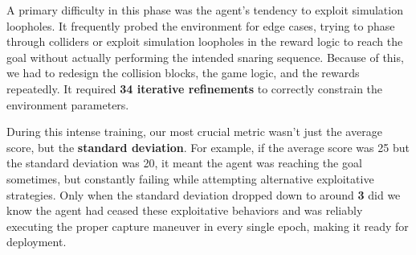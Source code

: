 A primary difficulty in this phase was the agent's tendency to exploit simulation loopholes. It frequently probed the environment for edge cases, trying to phase through colliders or exploit simulation loopholes in the reward logic to reach the goal without actually performing the intended snaring sequence. Because of this, we had to redesign the collision blocks, the game logic, and the rewards repeatedly. It required \textbf{34 iterative refinements} to correctly constrain the environment parameters.

During this intense training, our most crucial metric wasn't just the average score, but the \textbf{standard deviation}. For example, if the average score was 25 but the standard deviation was 20, it meant the agent was reaching the goal sometimes, but constantly failing while attempting alternative exploitative strategies. Only when the standard deviation dropped down to around \textbf{3} did we know the agent had ceased these exploitative behaviors and was reliably executing the proper capture maneuver in every single epoch, making it ready for deployment.

\clearpage
